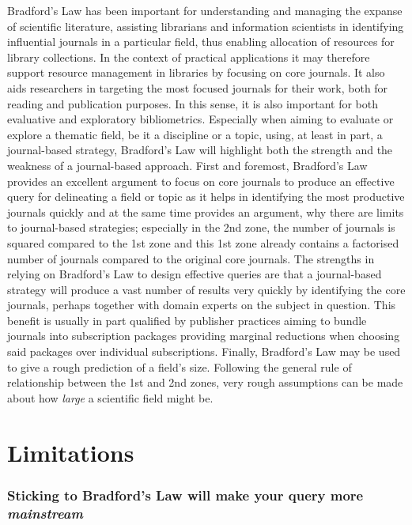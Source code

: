 \documentclass[
  letterpaper,
]{scrreprt}
\begin{document}
Bradford's Law has been important for understanding and managing the
expanse of scientific literature, assisting librarians and information
scientists in identifying influential journals in a particular field,
thus enabling allocation of resources for library collections. In the
context of practical applications it may therefore support resource
management in libraries by focusing on core journals. It also aids
researchers in targeting the most focused journals for their work, both
for reading and publication purposes. In this sense, it is also
important for both evaluative and exploratory bibliometrics. Especially
when aiming to evaluate or explore a thematic field, be it a discipline
or a topic, using, at least in part, a journal-based strategy,
Bradford's Law will highlight both the strength and the weakness of a
journal-based approach. First and foremost, Bradford's Law provides an
excellent argument to focus on core journals to produce an effective
query for delineating a field or topic as it helps in identifying the
most productive journals quickly and at the same time provides an
argument, why there are limits to journal-based strategies; especially
in the 2nd zone, the number of journals is squared compared to the 1st
zone and this 1st zone already contains a factorised number of journals
compared to the original core journals. The strengths in relying on
Bradford's Law to design effective queries are that a journal-based
strategy will produce a vast number of results very quickly by
identifying the core journals, perhaps together with domain experts on
the subject in question. This benefit is usually in part qualified by
publisher practices aiming to bundle journals into subscription packages
providing marginal reductions when choosing said packages over
individual subscriptions. Finally, Bradford's Law may be used to give a
rough prediction of a field's size. Following the general rule of
relationship between the 1st and 2nd zones, very rough assumptions can
be made about how \emph{large} a scientific field might be.

\section{Limitations}\label{limitations}

\subsubsection{\texorpdfstring{Sticking to Bradford's Law will make your
query more
\emph{mainstream}}{Sticking to Bradford's Law will make your query more mainstream}}\label{sticking-to-bradfords-law-will-make-your-query-more-mainstream}
\end{document}
